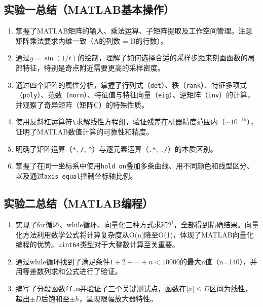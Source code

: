\documentclass{../common/SCNU_Experimental_Report}
\begin{document}
\subsection{实验一总结（MATLAB基本操作）}
\begin{enumerate}
    \item 掌握了MATLAB矩阵的输入、乘法运算、子矩阵提取及工作空间管理。注意矩阵乘法要求内维一致（A的列数 = B的行数）。
    \item 通过$y = \sin(1/t)$的绘制，理解了如何选择合适的采样步距来刻画函数的局部特征，特别是奇点附近需要更高的采样密度。
    \item 通过四个矩阵的属性分析，掌握了行列式（\texttt{det}）、秩（\texttt{rank}）、特征多项式（\texttt{poly}）、范数（\texttt{norm}）、特征值与特征向量（\texttt{eig}）、逆矩阵（\texttt{inv}）的计算，并观察了奇异矩阵（矩阵C）的特殊性质。
    \item 使用反斜杠运算符\texttt{\textbackslash}求解线性方程组，验证残差在机器精度范围内（$\sim 10^{-15}$），证明了MATLAB数值计算的可靠性和精度。
    \item 明确了矩阵运算（\texttt{*}, \texttt{/}, \texttt{\^}）与逐元素运算（\texttt{.*}, \texttt{./}）的本质区别。
    \item 掌握了在同一坐标系中使用\texttt{hold on}叠加多条曲线、用不同颜色和线型区分、以及通过\texttt{axis equal}控制坐标轴比例。
\end{enumerate}

\subsection{实验二总结（MATLAB编程）}
\begin{enumerate}
    \item 实现了for循环、while循环、向量化三种方式求和$2^i$，全部得到精确结果。向量化方法利用数学公式将计算复杂度从O(n)降至O(1)，体现了MATLAB向量化编程的优势。\texttt{uint64}类型对于大整数计算至关重要。
    \item 通过while循环找到了满足条件$1+2+\cdots+n < 10000$的最大n值（n=140），并用等差数列求和公式进行了验证。
    \item 编写了分段函数\texttt{ff.m}并验证了三个关键测试点，函数在$|x| \leq D$区间为线性，超出$\pm D$后饱和至$\pm h$，呈现限幅放大器特性。
\end{enumerate}
\end{document}
